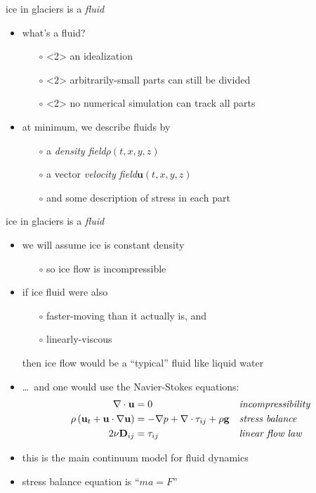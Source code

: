 \begin{frame}{ice in glaciers is a \emph{fluid}}

\begin{itemize}
\item<1-> what's a fluid?
  \begin{itemize}
  \item[$\circ$]<2> an idealization
  \item[$\circ$]<2> arbitrarily-small parts can still be divided
  \item[$\circ$]<2> no numerical simulation can track all parts
  \end{itemize}

\bigskip\bigskip
\item<2> at minimum, we describe fluids by
  \begin{itemize}
  \item[$\circ$] a \emph{density field}\quad $\rho(t,x,y,z)$
  \item[$\circ$] a vector \emph{velocity field}\quad $\mathbf{u}(t,x,y,z)$
  \item[$\circ$] and some description of stress in each part
  \end{itemize}
\end{itemize}
\end{frame}


\begin{frame}{ice in glaciers is a \emph{fluid} }

\begin{itemize}
\item we will assume ice is constant density
  \begin{itemize}
  \item[$\circ$] so ice flow is incompressible
  \end{itemize}

\medskip
\item if ice fluid were also
  \begin{itemize}
  \item[$\circ$] faster-moving than it actually is, and
  \item[$\circ$] linearly-viscous
  \end{itemize}
  then ice flow would be a ``typical'' fluid like liquid water
\item \dots\, and one would use the Navier-Stokes equations:
\begin{align*}
\nabla \cdot \mathbf{u} &= 0 &&\text{\emph{incompressibility}} \\
\rho \left(\mathbf{u}_t + \mathbf{u}\cdot\nabla \mathbf{u}\right) &= -\nabla p + \nabla \cdot \tau_{ij} + \rho \mathbf{g} &&\text{\emph{stress balance}} \\
2 \nu \mathbf{D}_{ij} &= \tau_{ij} &&\text{\emph{linear flow law}}
\end{align*}

\smallskip
\item this is the main continuum model for fluid dynamics
\item stress balance equation is ``$m a = F$''
\end{itemize}
\end{frame}


